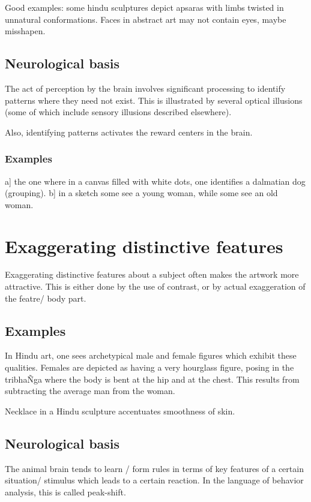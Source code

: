 \documentclass[oneside, article]{memoir}
\begin{document}
Good examples: some hindu sculptures depict apsaras with limbs twisted in unnatural conformations. Faces in abstract art may not contain eyes, maybe misshapen.

\subsection{Neurological basis}
The act of perception by the brain involves significant processing to identify patterns where they need not exist. This is illustrated by several optical illusions (some of which include sensory illusions described elsewhere). 

Also, identifying patterns activates the reward centers in the brain.

\subsubsection{Examples}
a] the one where in a canvas filled with white dots, one identifies a dalmatian dog (grouping).  b] in a sketch some see a young woman, while some see an old woman.

\section{Exaggerating distinctive features}
Exaggerating distinctive features about a subject often makes the artwork more attractive.  This is either done by the use of contrast, or by actual exaggeration of the featre/ body part.


\subsection{Examples}
In Hindu art, one sees archetypical male and female figures which exhibit these qualities. Females are depicted as having a very hourglass figure, posing in the tribha\~Nga where the body is bent at the hip and at the chest. This results from subtracting the average man from the woman.

Necklace in a Hindu sculpture accentuates smoothness of skin.



\subsection{Neurological basis}
The animal brain tends to learn / form rules in terms of key features of a certain situation/ stimulus which leads to a certain reaction. In the language of behavior analysis, this is called peak-shift.
\end{document}

